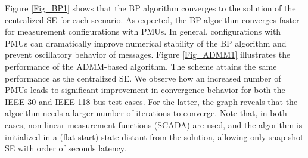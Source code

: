 \documentclass[journal]{IEEEtran}
\begin{document}
Figure \ref{Fig_BP1} shows that the BP algorithm converges to the solution of the centralized SE for each scenario. As expected, the BP algorithm converges faster for measurement configurations with PMUs. In general, configurations with PMUs can dramatically improve numerical stability of the BP algorithm and prevent oscillatory behavior of messages. Figure \ref{Fig_ADMM1} illustrates the performance of the ADMM-based algorithm. The scheme attains the same performance as the centralized SE. We observe how an increased number of PMUs leads to significant improvement in convergence behavior for both the IEEE 30 and IEEE 118 bus test cases. For the latter, the graph reveals that the algorithm needs a larger number of iterations to converge. Note that, in both cases, non-linear measurement functions (SCADA) are used, and the algorithm is initialized in a (flat-start) state distant from the solution, allowing only snap-shot SE with order of seconds latency. 
\end{document}
